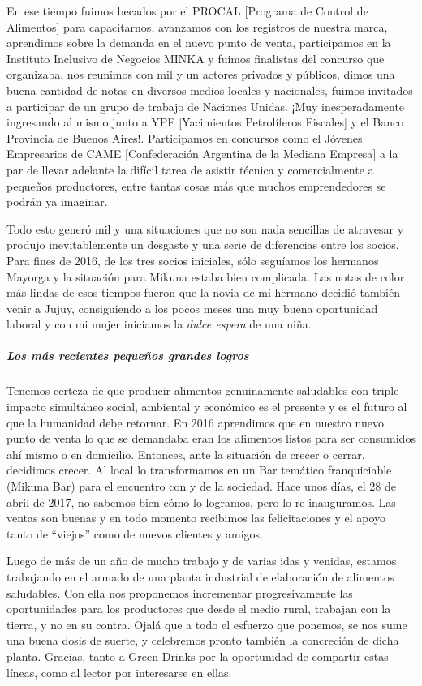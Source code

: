 \documentclass[
]{article}
\begin{document}
En ese tiempo fuimos becados por el PROCAL {[}Programa de Control de
Alimentos{]} para capacitarnos, avanzamos con los registros de nuestra
marca, aprendimos sobre la demanda en el nuevo punto de venta,
participamos en la Instituto Inclusivo de Negocios MINKA y fuimos
finalistas del concurso que organizaba, nos reunimos con mil y un
actores privados y públicos, dimos una buena cantidad de notas en
diversos medios locales y nacionales, fuimos invitados a participar de
un grupo de trabajo de Naciones Unidas. ¡Muy inesperadamente ingresando
al mismo junto a YPF {[}Yacimientos Petrolíferos Fiscales{]} y el Banco
Provincia de Buenos Aires!. Participamos en concursos como el Jóvenes
Empresarios de CAME {[}Confederación Argentina de la Mediana Empresa{]}
a la par de llevar adelante la difícil tarea de asistir técnica y
comercialmente a pequeños productores, entre tantas cosas más que muchos
emprendedores se podrán ya imaginar.

Todo esto generó mil y una situaciones que no son nada sencillas de
atravesar y produjo inevitablemente un desgaste y una serie de
diferencias entre los socios. Para fines de 2016, de los tres socios
iniciales, sólo seguíamos los hermanos Mayorga y la situación para
Mikuna estaba bien complicada. Las notas de color más lindas de esos
tiempos fueron que la novia de mi hermano decidió también venir a Jujuy,
consiguiendo a los pocos meses una muy buena oportunidad laboral y con
mi mujer iniciamos la \emph{dulce espera} de una niña.

\hypertarget{los-muxe1s-recientes-pequeuxf1os-grandes-logros}{%
\subparagraph{Los más recientes pequeños grandes
logros}\label{los-muxe1s-recientes-pequeuxf1os-grandes-logros}}

Tenemos certeza de que producir alimentos genuinamente saludables con
triple impacto simultáneo social, ambiental y económico es el presente y
es el futuro al que la humanidad debe retornar. En 2016 aprendimos que
en nuestro nuevo punto de venta lo que se demandaba eran los alimentos
listos para ser consumidos ahí mismo o en domicilio. Entonces, ante la
situación de crecer o cerrar, decidimos crecer. Al local lo
transformamos en un Bar temático franquiciable (Mikuna Bar) para el
encuentro con y de la sociedad. Hace unos días, el 28 de abril de 2017,
no sabemos bien cómo lo logramos, pero lo re inauguramos. Las ventas son
buenas y en todo momento recibimos las felicitaciones y el apoyo tanto
de ``viejos'' como de nuevos clientes y amigos.

Luego de más de un año de mucho trabajo y de varias idas y venidas,
estamos trabajando en el armado de una planta industrial de elaboración
de alimentos saludables. Con ella nos proponemos incrementar
progresivamente las oportunidades para los productores que desde el
medio rural, trabajan con la tierra, y no en su contra. Ojalá que a todo
el esfuerzo que ponemos, se nos sume una buena dosis de suerte, y
celebremos pronto también la concreción de dicha planta. Gracias, tanto
a Green Drinks por la oportunidad de compartir estas líneas, como al
lector por interesarse en ellas.
\end{document}
